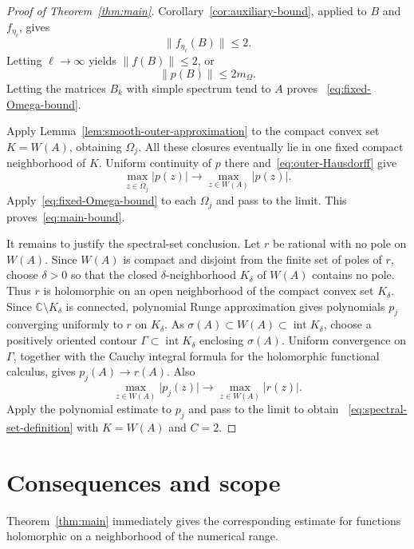 \documentclass{aomart}
\theoremstyle{definition}
\newcommand{\C}{\mathbb C}
\begin{document}
\begin{proof}[Proof of Theorem~\ref{thm:main}]
Corollary~\ref{cor:auxiliary-bound}, applied to $B$ and
$f_{\eta_\ell}$, gives
\[
  \lVert f_{\eta_\ell}(B)\rVert\leq2.
\]
Letting $\ell\to\infty$ yields $\lVert f(B)\rVert\leq2$, or
\begin{equation}
  \lVert p(B)\rVert\leq2m_\Omega.
  \label{eq:B-Omega-bound}
\end{equation}
Letting the matrices $B_k$ with simple spectrum tend to $A$ proves~%
\eqref{eq:fixed-Omega-bound}.

Apply Lemma~\ref{lem:smooth-outer-approximation} to the compact convex
set $K=W(A)$, obtaining $\Omega_j$.  All these closures eventually
lie in one fixed compact neighborhood of $K$.  Uniform continuity of
$p$ there and~\eqref{eq:outer-Hausdorff} give
\begin{equation}
  \max_{z\in\overline\Omega_j}\lvert p(z)\rvert
  \longrightarrow
  \max_{z\in W(A)}\lvert p(z)\rvert.
  \label{eq:maxima-converge}
\end{equation}
Apply~\eqref{eq:fixed-Omega-bound} to each $\Omega_j$ and pass to the
limit.  This proves~\eqref{eq:main-bound}.

It remains to justify the spectral-set conclusion.  Let $r$ be
rational with no pole on $W(A)$.  Since $W(A)$ is compact and disjoint
from the finite set of poles of $r$, choose $\delta>0$ so that the
closed $\delta$-neighborhood $K_\delta$ of $W(A)$ contains no pole.
Thus $r$ is holomorphic on an open neighborhood of the compact convex
set $K_\delta$.  Since $\C\setminus K_\delta$ is connected, polynomial
Runge approximation gives polynomials $p_j$ converging uniformly to
$r$ on $K_\delta$.  As
$\sigma(A)\subset W(A)\subset\operatorname{int}K_\delta$, choose a
positively oriented contour $\Gamma\subset\operatorname{int}K_\delta$
enclosing $\sigma(A)$.  Uniform convergence on $\Gamma$, together with
the Cauchy integral formula for the holomorphic functional calculus,
gives $p_j(A)\to r(A)$.  Also
\[
  \max_{z\in W(A)}\lvert p_j(z)\rvert
  \longrightarrow
  \max_{z\in W(A)}\lvert r(z)\rvert.
\]
Apply the polynomial estimate to $p_j$ and pass to the limit to obtain~%
\eqref{eq:spectral-set-definition} with $K=W(A)$ and $C=2$.
\end{proof}

\section{Consequences and scope}
\label{sec:consequences}

Theorem~\ref{thm:main} immediately gives the corresponding estimate for
functions holomorphic on a neighborhood of the numerical range.
\end{document}
